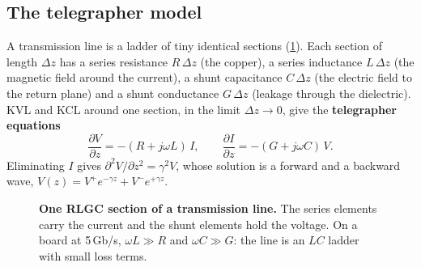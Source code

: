 \subsection{The telegrapher model}
A transmission line is a ladder of tiny identical sections (\cref{fig:ch3-rlgc}). Each section of length $\Delta z$ has a series resistance $R\,\Delta z$ (the copper), a series inductance $L\,\Delta z$ (the magnetic field around the current), a shunt capacitance $C\,\Delta z$ (the electric field to the return plane) and a shunt conductance $G\,\Delta z$ (leakage through the dielectric). KVL and KCL around one section, in the limit $\Delta z\to0$, give the \textbf{telegrapher equations}
\begin{equation}
  \frac{\partial V}{\partial z} = -(R + j\omega L)\, I, \qquad
  \frac{\partial I}{\partial z} = -(G + j\omega C)\, V .
\end{equation}
Eliminating $I$ gives $\partial^2 V/\partial z^2 = \gamma^2 V$, whose solution is a forward and a backward wave, $V(z) = V^+e^{-\gamma z} + V^-e^{+\gamma z}$.

\begin{figure}[tbp]
\centering
{}
\caption{\textbf{One RLGC section of a transmission line.} The series elements carry the current and the shunt elements hold the voltage. On a board at 5\,Gb/s, $\omega L \gg R$ and $\omega C \gg G$: the line is an $LC$ ladder with small loss terms.}
\label{fig:ch3-rlgc}
\end{figure}

